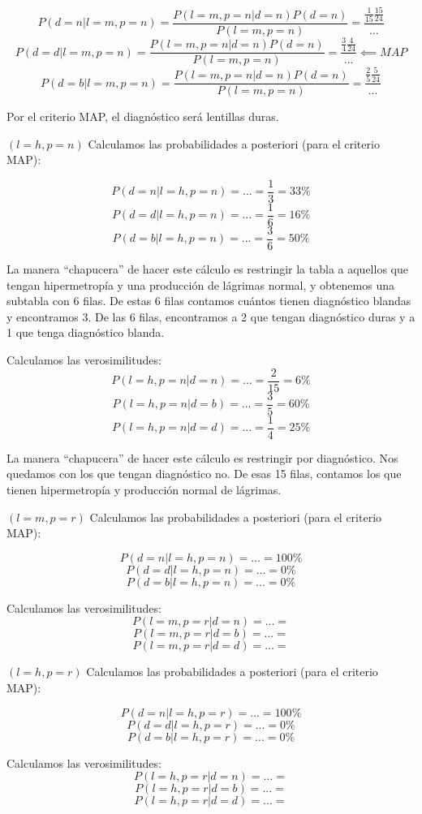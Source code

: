 \documentclass{apuntes}
\begin{document}
\begin{problem}[lentillas]
\[P(d=n | l=m, p=n ) = \frac{P(l=m, p=n | d=n) P(d=n)}{P(l=m, p=n)} = \frac{\frac{1}{15}\frac{15}{24}}{...}\]
\[P(d=d | l=m, p=n ) = \frac{P(l=m, p=n | d=n) P(d=n)}{P(l=m, p=n)} = \frac{\frac{3}{4}\frac{4}{24}}{...} \impliedby MAP\]
\[P(d=b | l=m, p=n ) = \frac{P(l=m, p=n | d=n) P(d=n)}{P(l=m, p=n)} = \frac{\frac{2}{5}\frac{5}{24}}{...}\]

Por el criterio MAP, el diagnóstico será lentillas duras.

\spart $(l=h,p=n)$ Calculamos las probabilidades a posteriori (para el criterio MAP):

\[P(d=n | l=h, p=n) = ... = \frac{1}{3} = 33\%\]
\[P(d=d | l=h, p=n) = ... = \frac{1}{6} = 16\%\]
\[P(d=b | l=h, p=n) = ... = \frac{3}{6} = 50\%\]

La manera ``chapucera'' de hacer este cálculo es restringir la tabla a aquellos que tengan hipermetropía y una producción de lágrimas normal, y obtenemos una subtabla con 6 filas. De estas 6 filas contamos cuántos tienen diagnóstico blandas y encontramos 3. De las 6 filas, encontramos a 2 que tengan diagnóstico duras y a 1 que tenga diagnóstico blanda.

Calculamos las verosimilitudes:
\[P(l=h, p=n | d=n) = ... = \frac{2}{15} = 6\%\]
\[P(l=h, p=n | d=b) = ... = \frac{3}{5} = 60\%\]
\[P(l=h, p=n | d=d) = ... = \frac{1}{4} = 25\%\]

La manera ``chapucera'' de hacer este cálculo es restringir por diagnóstico. Nos quedamos con los que tengan diagnóstico no. De esas 15 filas, contamos los que tienen hipermetropía y producción normal de lágrimas.


\spart $(l=m, p=r)$ Calculamos las probabilidades a posteriori (para el criterio MAP):

\[P(d=n | l=h, p=n) = ... = 100\%\]
\[P(d=d | l=h, p=n) = ... = 0\%\]
\[P(d=b | l=h, p=n) = ... = 0\%\]


Calculamos las verosimilitudes:
\[P(l=m, p=r | d=n) = ... = \]
\[P(l=m, p=r | d=b) = ... = \]
\[P(l=m, p=r | d=d) = ... = \]


\spart $(l=h, p=r)$ Calculamos las probabilidades a posteriori (para el criterio MAP):

\[P(d=n | l=h, p=r) = ... = 100\%\]
\[P(d=d | l=h, p=r) = ... = 0\%\]
\[P(d=b | l=h, p=r) = ... = 0\%\]

Calculamos las verosimilitudes:
\[P(l=h, p=r | d=n) = ... = \]
\[P(l=h, p=r | d=b) = ... = \]
\[P(l=h, p=r | d=d) = ... = \]

\end{problem}
\end{document}
